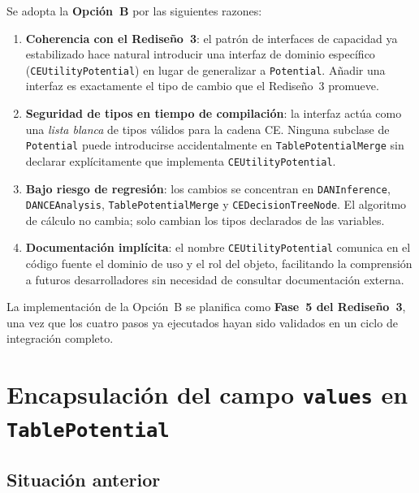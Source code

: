 \documentclass[11pt,a4paper]{article}
\newcommand{\code}[1]{\texttt{#1}}
\begin{document}
Se adopta la \textbf{Opción~B} por las siguientes razones:

\begin{enumerate}
  \item \textbf{Coherencia con el Rediseño~3}: el patrón de interfaces
        de capacidad ya estabilizado hace natural introducir una interfaz de
        dominio específico (\code{CEUtilityPotential}) en lugar de
        generalizar a \code{Potential}.  Añadir una interfaz es
        exactamente el tipo de cambio que el Rediseño~3 promueve.

  \item \textbf{Seguridad de tipos en tiempo de compilación}: la interfaz
        actúa como una \emph{lista blanca} de tipos válidos para la cadena
        CE.  Ninguna subclase de \code{Potential} puede introducirse
        accidentalmente en \code{TablePotentialMerge} sin declarar
        explícitamente que implementa \code{CEUtilityPotential}.

  \item \textbf{Bajo riesgo de regresión}: los cambios se concentran en
        \code{DANInference}, \code{DANCEAnalysis},
        \code{TablePotentialMerge} y \code{CEDecisionTreeNode}.
        El algoritmo de cálculo no cambia; solo cambian los tipos declarados
        de las variables.

  \item \textbf{Documentación implícita}: el nombre
        \code{CEUtilityPotential} comunica en el código fuente
        el dominio de uso y el rol del objeto, facilitando la comprensión
        a futuros desarrolladores sin necesidad de consultar documentación
        externa.
\end{enumerate}

La implementación de la Opción~B se planifica como \textbf{Fase~5 del
Rediseño~3}, una vez que los cuatro pasos ya ejecutados hayan sido
validados en un ciclo de integración completo.

\section{Encapsulación del campo \code{values} en \code{TablePotential}}
\label{sec:encapsulacion-values}

\subsection{Situación anterior}
\end{document}

